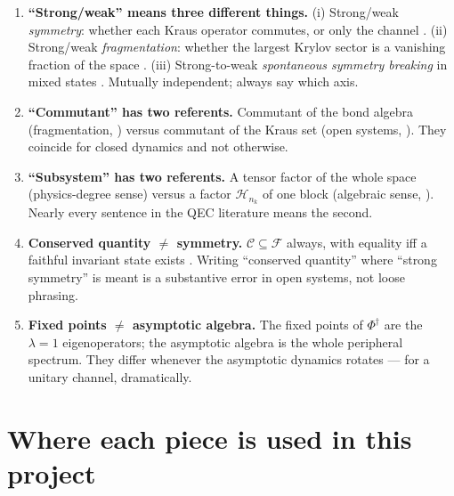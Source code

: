 \documentclass[11pt]{article}
\newcommand{\Phid}{\Phi^{\dagger}}
\newcommand{\C}{\mathcal{C}}
\newcommand{\F}{\mathcal{F}}
\newcommand{\HH}{\mathcal{H}}
\theoremstyle{plain}
\theoremstyle{remark}
\begin{document}
\begin{enumerate}
\item \textbf{``Strong/weak'' means three different things.}
(i) Strong/weak \emph{symmetry}: whether each Kraus operator commutes, or only
the channel \cite{Buca2012}. (ii) Strong/weak \emph{fragmentation}: whether the
largest Krylov sector is a vanishing fraction of the space \cite{Sala2020}.
(iii) Strong-to-weak \emph{spontaneous symmetry breaking} in mixed states
\cite{Lessa2024}. Mutually independent; always say which axis.

\item \textbf{``Commutant'' has two referents.} Commutant of the bond algebra
(fragmentation, \cite{MM2022}) versus commutant of the Kraus set (open systems,
\cite{Buca2012}). They coincide for closed dynamics and not otherwise.

\item \textbf{``Subsystem'' has two referents.} A tensor factor of the whole
space (physics-degree sense) versus a factor $\HH_{n_k}$ of one block
(algebraic sense, \cite{KLV2000, KLP2005}). Nearly every sentence in the QEC
literature means the second.

\item \textbf{Conserved quantity $\ne$ symmetry.} $\C \subseteq \F$ always, with
equality iff a faithful invariant state exists \cite{Frigerio1978}. Writing
``conserved quantity'' where ``strong symmetry'' is meant is a substantive
error in open systems, not loose phrasing.

\item \textbf{Fixed points $\ne$ asymptotic algebra.} The fixed points of
$\Phid$ are the $\lambda = 1$ eigenoperators; the asymptotic algebra is the
whole peripheral spectrum. They differ whenever the asymptotic dynamics
rotates --- for a unitary channel, dramatically.
\end{enumerate}

\section{Where each piece is used in this project}
\label{sec:project}
\end{document}
